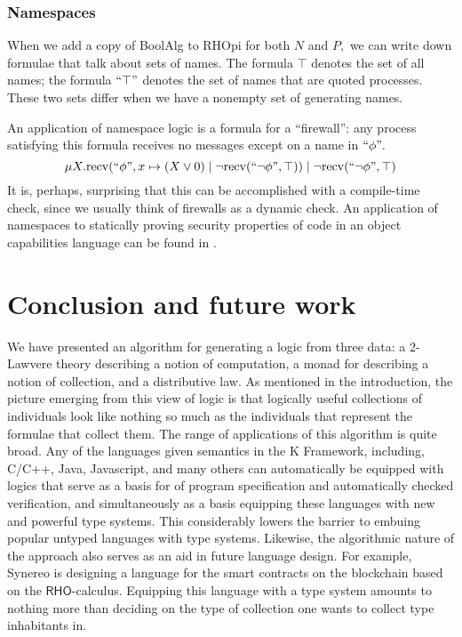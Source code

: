 \documentclass{llncs}
\newcommand{\recv}{\mathrm{recv}}
\renewcommand{\quote}[1]{``#1"}
\begin{document}
\subsubsection{Namespaces}

When we add a copy of BoolAlg to RHOpi for both $N$ and $P,$ we can write down formulae that talk about sets of names.  The formula $\top$ denotes the set of all names; the formula $\quote{\top}$ denotes the set of names that are quoted processes.  These two sets differ when we have a nonempty set of generating names.

An application of namespace logic is a formula for a ``firewall'': any process satisfying this formula receives no messages except on a name in $\quote{\phi}.$
\[ \mu X. \recv(\quote{\phi}, x \mapsto (X \lor 0)\;|\;\neg\recv(\quote{\neg \phi}, \top))\;|\;\neg\recv(\quote{\neg \phi}, \top) \]
It is, perhaps, surprising that this can be accomplished with a compile-time check, since we usually think of firewalls as a dynamic check.  An application of namespaces to statically proving security properties of code in an object capabilities language can be found in \cite{DBLP:journals/corr/MeredithSD13}.

\section{Conclusion and future work}
We have presented an algorithm for generating a logic from three data:
a 2-Lawvere theory describing a notion of computation, a monad for
describing a notion of collection, and a distributive law. As
mentioned in the introduction, the picture emerging from this view of
logic is that logically useful collections of individuals look like
nothing so much as the individuals that represent the formulae that
collect them.  The range of applications of this algorithm is quite
broad.  Any of the languages given semantics in the K Framework,
including, C/C++, Java, Javascript, and many others can automatically
be equipped with logics that serve as a basis for of program
specification and automatically checked verification, and
simultaneously as a basis equipping these languages with new and
powerful type systems.  This considerably lowers the barrier to
embuing popular untyped languages with type systems.  Likewise, the
algorithmic nature of the approach also serves as an aid in future
language design.  For example, Synereo is designing a language for the
smart contracts on the blockchain based on the
$\mathsf{RHO}$-calculus.  Equipping this language with a type system
amounts to nothing more than deciding on the type of collection one
wants to collect type inhabitants in.



\end{document}

